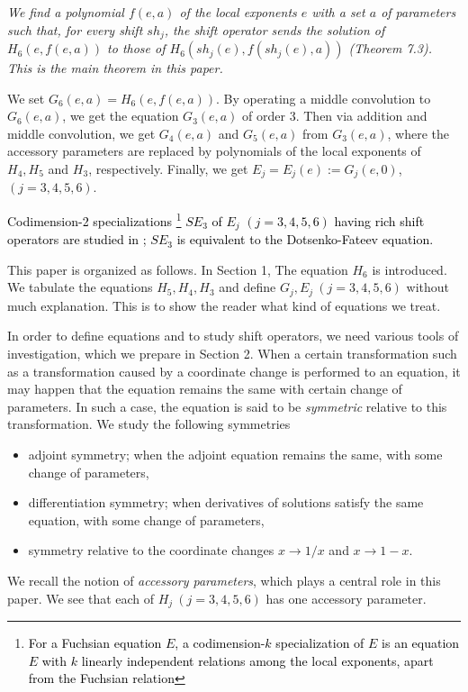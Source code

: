 \documentclass[a4paper,12pt]{article}
\theoremstyle{definition}
\theoremstyle{remark}
\numberwithin{equation}{section} %
\newcommand{\red}[1]{\textcolor{black}{#1}}
\begin{document}
\par\medskip
  {\sl We find a polynomial $f(e,a)$ of the local exponents $e$ with a set $a$ of parameters such that,
for every shift $sh_j$, the shift operator sends the solution of $H_6(e,f(e,a))$ to those of $H_6(sh_j(e),f(sh_j(e),a))$ (Theorem 7.3).
This is the main theorem in this paper.}
  \par\medskip
We set $G_6(e,a)=H_6(e,f(e,a))$. By operating a middle convolution to $G_6(e,a)$, we get the equation $G_3(e,a)$ of order 3.
 Then via addition and middle convolution, we get $G_4(e,a)$ and $G_5(e,a)$ from $G_3(e,a)$, where the accessory parameters are replaced by polynomials of the local exponents of $H_4,H_5$ and $H_3$, respectively. Finally, we get $E_j=E_j(e):=G_j(e,0)$, $(j=3,4,5,6)$.
 \par\medskip
\red{Codimension-2 specializations
\footnote{\red{For a Fuchsian equation $E$, a codimension-$k$ specialization of $E$ is an equation $E$ with $k$ linearly independent relations among the local exponents, apart from the Fuchsian relation}}
 $S\!E_3$ of $E_j$ $(j=3,4,5,6)$ having rich shift operators are studied in  \cite{HOSY2}; $S\!E_3$ is equivalent to the Dotsenko-Fateev equation.}




   \par\bigskip
   This paper is organized as follows. In Section 1, The equation $H_6$ is introduced. We tabulate the equations $H_5,H_4, H_3$ and define $G_j,E_j\ (j=3,4,5,6)$ without much explanation. This is to show the reader what kind of equations we treat. 
   
   In order to define equations and to study shift operators,
   we need various tools of investigation, which we prepare in Section 2. 
When a certain transformation such as a transformation caused by a
coordinate change is performed to an equation,
it may happen that the equation remains the same 
with certain change of parameters. In such a case,
the equation is said to be {\it symmetric} relative to this transformation.
We study the following symmetries
\begin{itemize}
\item adjoint symmetry; when the adjoint equation remains the same,
  with some change of parameters, 
\item differentiation symmetry; when derivatives of solutions satisfy the same equation, with some change of parameters, 
\item symmetry relative to the coordinate changes $x\to1/x$ and $x\to1-x$.
\end{itemize}
We recall the notion of {\it accessory parameters}, which plays a central role in this paper.
We see that each of $H_j\ (j=3,4,5,6)$ has one accessory parameter. 
\par\smallskip
\end{document}
